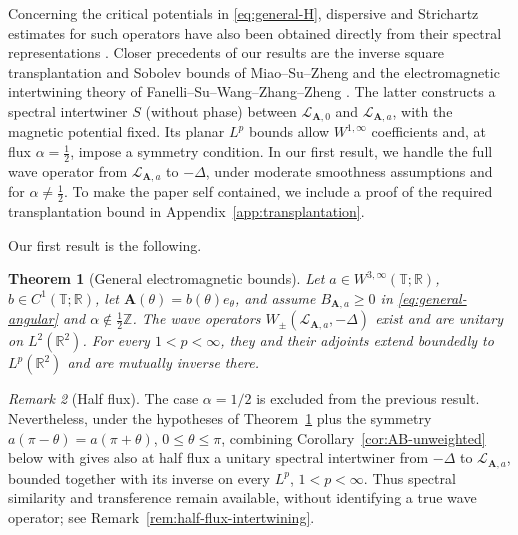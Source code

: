 \documentclass[11pt,a4paper,reqno,backref=page]{amsart}
\newcommand{\R}{\mathbb R}
\newcommand{\Z}{\mathbb Z}
\newcommand{\T}{\mathbb T}
\numberwithin{equation}{section}
\newtheorem{theorem}{Theorem}[section]
\theoremstyle{definition}
\theoremstyle{remark}
\newtheorem{remark}[theorem]{Remark}
\begin{document}
Concerning the critical potentials in \eqref{eq:general-H},
dispersive and Strichartz estimates for
such operators have also been obtained directly from their
spectral representations \cite{FFFP2013,FZZ2022,GYZZ2022}.
Closer precedents of our results are the inverse square 
transplantation
and Sobolev bounds of Miao--Su--Zheng \cite{MSZ2023} and the
electromagnetic intertwining theory of
Fanelli--Su--Wang--Zhang--Zheng \cite{FSWZZ2026}.
The latter constructs a spectral intertwiner $S$
(without phase) between $\mathcal L_{\mathbf A,0}$ and
$\mathcal L_{\mathbf A,a}$, with the magnetic potential
fixed. Its planar $L^p$ bounds allow $W^{1,\infty}$
coefficients and, at flux $\alpha=\frac 12$, impose a symmetry
condition. In our first result, we handle
the full wave operator from $\mathcal L_{\mathbf A,a}$
to $-\Delta$, under moderate smoothness assumptions
and for $\alpha\neq \frac 12$. To make the paper self contained,
we include a proof of the required transplantation bound in
Appendix~\ref{app:transplantation}. 

Our first result is the following.

\begin{theorem}[General electromagnetic bounds]
\label{thm:general}
  Let $a\in W^{3,\infty}(\T;\R)$, $b\in C^{1}(\T;\R)$, let
  $\mathbf A(\theta)=b(\theta) e_\theta$, and assume 
  $B_{\mathbf A,a}\ge0$ in \eqref{eq:general-angular} and
  $\alpha\notin\frac12\Z$. The wave operators
  $W_\pm(\mathcal L_{\mathbf A,a},-\Delta)$ exist and are
  unitary on $L^2(\R^2)$. For every $1<p<\infty$, they and
  their adjoints extend boundedly to $L^p(\R^2)$ and are
  mutually inverse there. 
\end{theorem}

\begin{remark}[Half flux]
  The case $\alpha=1/2$ is excluded from the previous result.
  Nevertheless, under the
  hypotheses of Theorem~\ref{thm:general} plus the
  symmetry $a(\pi-\theta)=a(\pi+\theta)$,
  $0\le\theta\le\pi$, combining
  Corollary~\ref{cor:AB-unweighted} below with
  \cite[Theorem~2.13]{FSWZZ2026} gives also at half flux a unitary
  spectral intertwiner from $-\Delta$ to
  $\mathcal L_{\mathbf A,a}$, bounded together with its
  inverse on every $L^p$, $1<p<\infty$. Thus spectral
  similarity and transference remain available, without
  identifying a true wave operator; see
  Remark~\ref{rem:half-flux-intertwining}.
\end{remark}
\end{document}
